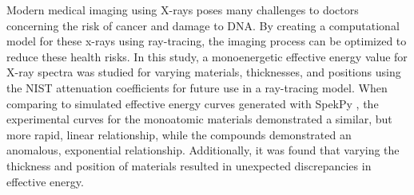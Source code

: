 Modern medical imaging using X-rays poses many challenges to doctors concerning the risk of cancer and damage to DNA. By creating a computational model for these x-rays using ray-tracing, the imaging process can be optimized to reduce these health risks. In this study, a monoenergetic effective energy value for X-ray spectra was studied for varying materials, thicknesses, and positions using the NIST attenuation coefficients for future use in a ray-tracing model. When comparing to simulated effective energy curves generated with SpekPy \cite{SpekPy}, the experimental curves for the monoatomic materials demonstrated a similar, but more rapid, linear relationship, while the compounds demonstrated an anomalous, exponential relationship. Additionally, it was found that varying the thickness and position of materials resulted in unexpected discrepancies in effective energy.